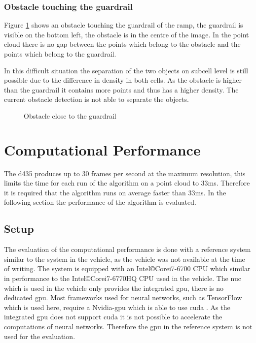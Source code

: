 \subsubsection{Obstacle touching the guardrail}
Figure \ref{fig:eval:pc0NotMerged} shows an obstacle touching the guardrail of the ramp, the guardrail is visible on the bottom left, the obstacle is in the centre of the image. 
In the point cloud there is no gap between the points which belong to the obstacle and the points which belong to the guardrail. 

In this difficult situation the separation of the two objects on subcell level is still possible due to the difference in density in both cells. As the obstacle is higher than the guardrail it contains more points and thus has a higher density. The current obstacle detection is not able to separate the objects.
\begin{figure}[h!]
    \centering
    \caption{Obstacle close to the guardrail}
    \label{fig:eval:pc0NotMerged}
\end{figure}

\section{Computational Performance}
The \ac{d435} produces up to 30 frames per second at the maximum resolution, this limits the time for each run of the algorithm on a point cloud to 33ms.
Therefore it is required that the algorithm runs on average faster than 33ms.
In the following section the performance of the algorithm is evaluated.

\subsection{Setup}
The evaluation of the computational performance is done with a reference system similar to the system in the vehicle, as the vehicle was not available at the time of writing.
The system is equipped with an Intel\copyright Core\texttrademark i7-6700 CPU which similar in performance to the Intel\copyright Core\texttrademark i7-6770HQ CPU used in the vehicle.
The \ac{nuc} which is used in the vehicle only provides the integrated \ac{gpu}, there is no dedicated \ac{gpu}. 
Most frameworks used for neural networks, such as TensorFlow which is used here, require a Nvidia-\ac{gpu} which is able to use \ac{cuda} \cite{tensorflow2019}. As the integrated \ac{gpu} does not support \ac{cuda} it is not possible to accelerate the computations of neural networks. Therefore the \ac{gpu} in the reference system is not used for the evaluation.


